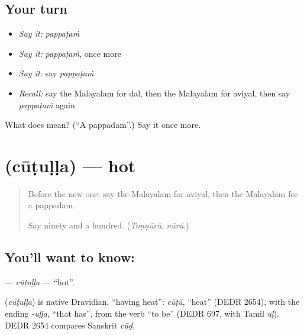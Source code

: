 \subsection*{Your turn}
\begin{itemize}
\raggedright
  \item \emph{Say it:} \emph{pappaṭaṁ}
  \item \emph{Say it:} \emph{pappaṭaṁ}, once more
  \item \emph{Say it:} say \emph{pappaṭaṁ}
  \item \emph{Recall:} say the Malayalam for dal, then the Malayalam for aviyal, then say \emph{pappaṭaṁ} again
\end{itemize}

\begin{tcolorbox}[breakable,colback=teal!4,colframe=teal!35!black,title={Before you move on}]
What does  mean? (\textquotedblleft{}A pappadam\textquotedblright{}.) Say it once more.
\end{tcolorbox}
\section[\texorpdfstring{\ml{ചൂടുള്ള} (cūṭuḷḷa)}{ചൂടുള്ള (cūṭuḷḷa)}]{ (cūṭuḷḷa) — hot}

\label{lesson:ML-C164-cutulla}



\begin{quote}
Before the new one: say the Malayalam for aviyal, then the Malayalam for a pappadam.

Say ninety and a hundred. (\emph{Toṇṇūṟŭ}, \emph{nūṟŭ}.)
\end{quote}

\subsection*{You'll want to know: }
\textbf{} — \emph{cūṭuḷḷa} — \textquotedblleft{}hot\textquotedblright{}.

\begin{cousinweb}
\textbf{} (\emph{cūṭuḷḷa}) is native Dravidian, \textquotedblleft{}having heat\textquotedblright{}: \emph{cūṭŭ}, \textquotedblleft{}heat\textquotedblright{} (DEDR 2654), with the ending \emph{-uḷḷa}, \textquotedblleft{}that has\textquotedblright{}, from the verb \textquotedblleft{}to be\textquotedblright{} (DEDR 697, with Tamil \emph{uḷ}). DEDR 2654 compares Sanskrit \emph{cūḍ}.
\end{cousinweb}

